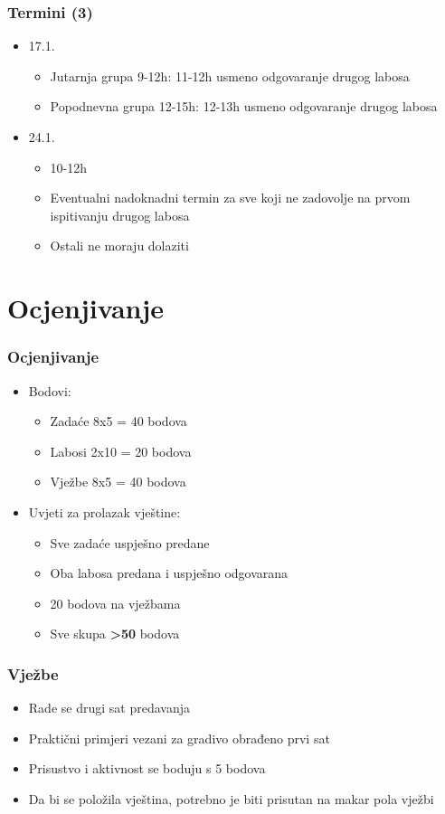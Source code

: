 \documentclass{beamer}
\begin{document}
\begin{frame}[t]
\frametitle{Termini (3)}
\begin{itemize}
	\item 17.1.
	\begin{itemize}
		\item Jutarnja grupa 9-12h: 11-12h usmeno odgovaranje drugog labosa
		\item Popodnevna grupa 12-15h: 12-13h usmeno odgovaranje drugog labosa
	\end{itemize}
	\item 24.1.
	\begin{itemize}
		\item 10-12h
		\item Eventualni nadoknadni termin za sve koji ne zadovolje na prvom ispitivanju drugog labosa
		\item Ostali ne moraju dolaziti
	\end{itemize}
\end{itemize}
\end{frame}

\section{Ocjenjivanje}
\begin{frame}[t]
\frametitle{Ocjenjivanje}
\begin{itemize}
	\item Bodovi:
	\begin{itemize}
		\item Zadaće 8x5  = 40 bodova
		\item Labosi 2x10 = 20 bodova
		\item Vježbe 8x5  = 40 bodova
	\end{itemize}
	\item Uvjeti za prolazak vještine:
	\begin{itemize}
		\item Sve zadaće uspješno predane
		\item Oba labosa predana i uspješno odgovarana
		\item 20 bodova na vježbama
		\item Sve skupa \textbf{\textgreater 50} bodova
	\end{itemize}
\end{itemize}
\end{frame}

\begin{frame}[t]
\frametitle{Vježbe}
\begin{itemize}
	\item Rade se drugi sat predavanja
	\item Praktični primjeri vezani za gradivo obrađeno prvi sat
	\item Prisustvo i aktivnost se boduju s 5 bodova
	\item Da bi se položila vještina, potrebno je biti prisutan na makar pola vježbi
\end{itemize}
\end{frame}
\end{document}
